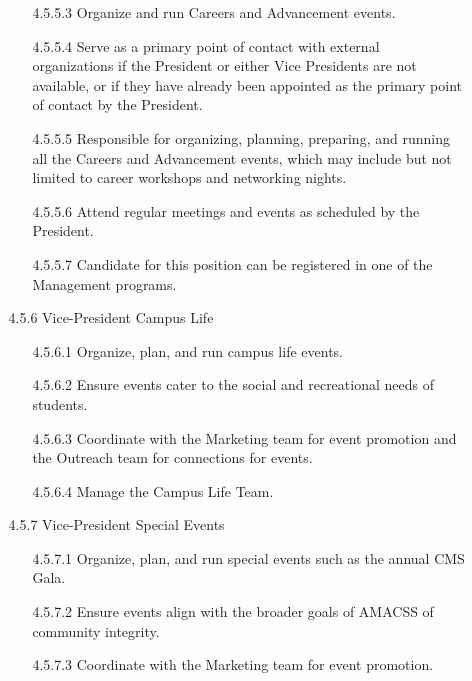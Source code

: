 \documentclass[12pt,a4paper]{article}
\begin{document}
\begin{enumerate}
\begin{enumerate}
\begin{enumerate}
\item[4.5.5.3] Organize and run Careers and Advancement events.

\item[4.5.5.4] Serve as a primary point of contact with external organizations if the President or either Vice Presidents are not available, or if they have already been appointed as the primary point of contact by the President.

\item[4.5.5.5] Responsible for organizing, planning, preparing, and running all the Careers and Advancement events, which may include but not limited to career workshops and networking nights.

\item[4.5.5.6] Attend regular meetings and events as scheduled by the President.

\item[4.5.5.7] Candidate for this position can be registered in one of the Management programs.
\end{enumerate}

\item[4.5.6] Vice-President Campus Life

\begin{enumerate}
\item[4.5.6.1] Organize, plan, and run campus life events.

\item[4.5.6.2] Ensure events cater to the social and recreational needs of students.

\item[4.5.6.3] Coordinate with the Marketing team for event promotion and the Outreach team for connections for events.

\item[4.5.6.4] Manage the Campus Life Team.
\end{enumerate}

\item[4.5.7] Vice-President Special Events

\begin{enumerate}
\item[4.5.7.1] Organize, plan, and run special events such as the annual CMS Gala. 

\item[4.5.7.2] Ensure events align with the broader goals of AMACSS of community integrity.

\item[4.5.7.3] Coordinate with the Marketing team for event promotion.


\end{enumerate}
\end{enumerate}
\end{enumerate}
\end{document}
